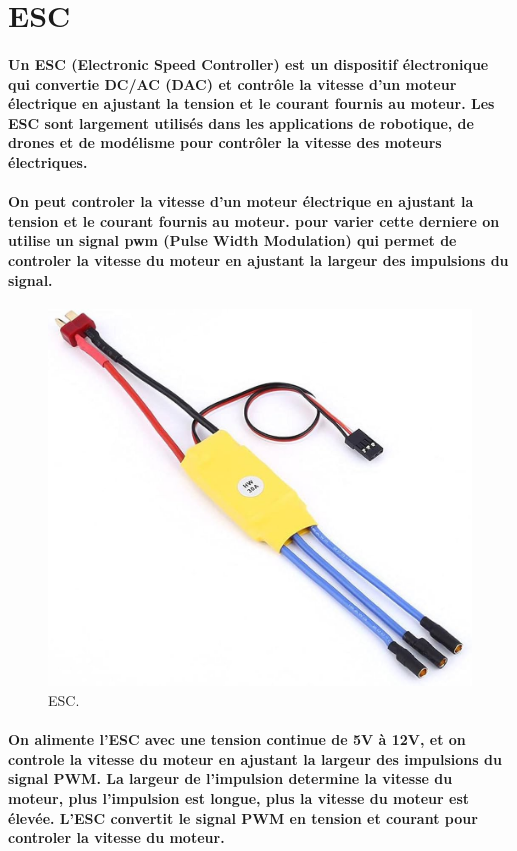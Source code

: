 \section{ESC}

\paragraph{Un ESC (Electronic Speed Controller) est un dispositif électronique qui convertie DC/AC (DAC) et contrôle la vitesse d'un moteur électrique en ajustant la tension et le courant fournis au moteur. Les ESC sont largement utilisés dans les applications de robotique, de drones et de modélisme pour contrôler la vitesse des moteurs électriques.}

\paragraph{On peut controler la vitesse d'un moteur électrique en ajustant la tension et le courant fournis au moteur. pour varier cette derniere on utilise un signal \acrshort{pwm} (Pulse Width Modulation) qui permet de controler la vitesse du moteur en ajustant la largeur des impulsions du signal.}

\begin{figure}[!htpb]
	\centering
	\includegraphics[width=0.7\linewidth]{Figures/esc.jpg}
	\caption[ESC]{ESC.}
\end{figure}

\paragraph{
	On alimente l'ESC avec une tension continue de 5V à 12V, et on controle la vitesse du moteur en ajustant la largeur des impulsions du signal PWM. La largeur de l'impulsion determine la vitesse du moteur, plus l'impulsion est longue, plus la vitesse du moteur est élevée. L'ESC convertit le signal PWM en tension et courant pour controler la vitesse du moteur.
}


